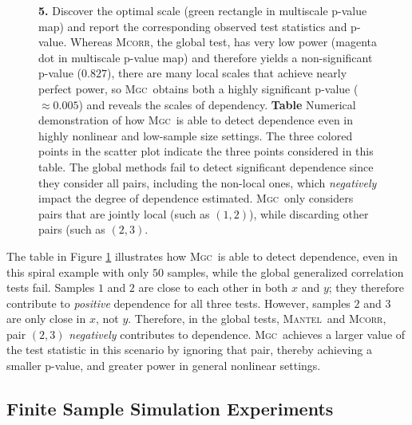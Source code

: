 \documentclass[11pt]{article}
\providecommand{\sct}[1]{{\normalfont\textsc{#1}}}
\newcommand{\Mgc}{\sct{Mgc}}
\newcommand{\Mcorr}{\sct{Mcorr}}
\newcommand{\Mantel}{\sct{Mantel}}
\begin{document}
\begin{figure}[htbp]
{\textbf{5.} Discover the optimal scale (green rectangle in multiscale p-value map) and report the corresponding observed test statistics and p-value. 
Whereas \Mcorr, the global test, has very low power (magenta dot in multiscale p-value map) and therefore yields a non-significant p-value ($0.827$),  there are many local scales that achieve nearly perfect power, so \Mgc~obtains both a highly significant p-value ($\approx 0.005$) and reveals the scales of dependency. \textbf{Table} Numerical demonstration of how \Mgc~is able to detect dependence even in highly nonlinear and low-sample size settings. The three colored points in the scatter plot indicate the three points considered in this table. 
The global methods fail to detect significant dependence since they consider all pairs, including the non-local ones, which \emph{negatively} impact the degree of dependence estimated.
\Mgc~only considers pairs that are jointly local (such as $(1,2)$), while discarding other pairs (such as $(2,3)$. 
}
\label{f:schematic}
\end{figure}


The table in Figure \ref{f:schematic}  illustrates how \Mgc~is able to detect dependence, even in this spiral example with only $50$ samples, while the global generalized correlation tests fail.  Samples $1$ and $2$ are close to each other in both $x$ and $y$; they therefore contribute to \emph{positive} dependence for all three tests.  However, samples $2$ and $3$ are only close in $x$, not $y$.  Therefore, in the global tests, \Mantel~and \Mcorr, pair $(2,3)$   \emph{negatively} contributes to dependence.  \Mgc~achieves a larger value of the test statistic in this scenario by ignoring that pair, thereby achieving a smaller p-value, and greater power in general nonlinear settings.  





\subsection*{Finite Sample Simulation Experiments}
\end{document}
